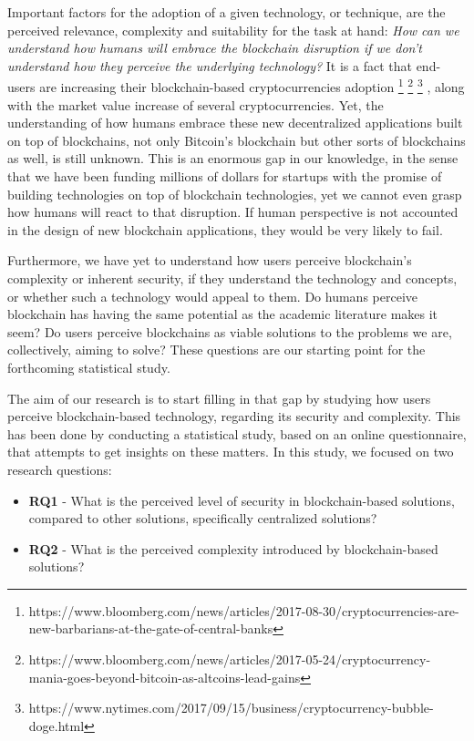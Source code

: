 Important factors for the adoption of a given technology, or technique, are the perceived relevance, complexity and suitability for the task at hand: \emph{How can we understand how humans will embrace the blockchain disruption if we don't understand how they perceive the underlying technology?} It is a fact that end-users are increasing their blockchain-based cryptocurrencies adoption \footnote{https://www.bloomberg.com/news/articles/2017-08-30/cryptocurrencies-are-new-barbarians-at-the-gate-of-central-banks} \footnote{https://www.bloomberg.com/news/articles/2017-05-24/cryptocurrency-mania-goes-beyond-bitcoin-as-altcoins-lead-gains} \footnote{https://www.nytimes.com/2017/09/15/business/cryptocurrency-bubble-doge.html} , along with the market value increase of several cryptocurrencies. Yet, the understanding of how humans embrace these new decentralized applications built on top of blockchains, not only Bitcoin's blockchain but other sorts of blockchains as well, is still unknown. This is an enormous gap in our knowledge, in the sense that we have been funding millions of dollars for startups with the promise of building technologies on top of blockchain technologies, yet we cannot even grasp how humans will react to that disruption. If human perspective is not accounted in the design of new blockchain applications, they would be very likely to fail.

Furthermore, we have yet to understand how users perceive blockchain's complexity or inherent security, if they understand the technology and concepts, or whether such a technology would appeal to them. Do humans perceive blockchain has having the same potential as the academic literature makes it seem? Do users perceive blockchains as viable solutions to the problems we are, collectively, aiming to solve? These questions are our starting point for the forthcoming statistical study.

The aim of our research is to start filling in that gap by studying how users perceive blockchain-based technology, regarding its security and complexity. This has been done by conducting a statistical study, based on an online questionnaire, that attempts to get insights on these matters. In this study, we focused on two research questions:

\begin{itemize}
	\item \textbf{RQ1} - What is the perceived level of security in blockchain-based solutions, compared to other solutions, specifically centralized solutions?
	\item \textbf{RQ2} - What is the perceived complexity introduced by blockchain-based solutions?
\end{itemize}

